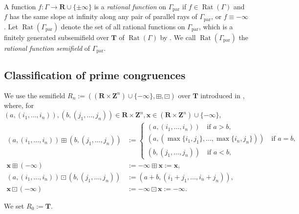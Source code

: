 \documentclass[a4paper,12pt]{amsart}
\theoremstyle{plain}
\theoremstyle{definition}
\begin{document}
A function $f : \varGamma \to \boldsymbol{R} \cup \{ \pm \infty \}$ is a \textit{rational function} on $\varGamma_{\operatorname{par}}$ if $f \in \operatorname{Rat}(\varGamma)$ and $f$ has the same slope at infinity along any pair of parallel rays of $\varGamma_{\operatorname{par}}$, or $f \equiv - \infty$.
Let $\operatorname{Rat}(\varGamma_{\operatorname{par}})$ denote the set of all rational functions on $\varGamma_{\operatorname{par}}$, which is a finitely generated subsemifield over $\boldsymbol{T}$ of $\operatorname{Rat}(\varGamma)$ by \cite[Proposition~4.4]{JuAe7}.
We call $\operatorname{Rat}(\varGamma_{\operatorname{par}})$ the \textit{rational function semifield} of $\varGamma_{\operatorname{par}}$.

\subsection{Classification of prime congruences}
    \label{subsection5.2}

We use the semifield $R_n := ((\boldsymbol{R} \times \boldsymbol{Z}^n) \cup \{ -\infty \}, \boxplus, \boxdot)$ over $\boldsymbol{T}$ introduced in \cite[Subsection~4.6]{JuAe7}, where, for $(a, (i_1, \ldots, i_n)), (b, (j_1, \ldots, j_n)) \in \boldsymbol{R} \times \boldsymbol{Z}^n, \boldsymbol{x} \in (\boldsymbol{R} \times \boldsymbol{Z}^n) \cup \{ -\infty \}$,
\begin{align*}
(a, (i_1, \ldots, i_n)) \boxplus (b, (j_1, \ldots, j_n)) &:= \begin{cases}
(a, (i_1, \ldots, i_n)) \quad \text{if }a > b,\\
(a, (\operatorname{max}\{ i_1, j_1 \}, \ldots, \operatorname{max}\{ i_n, j_n \})) \quad \text{if }a = b,\\
(b, (j_1, \ldots, j_n)) \quad \text{if }a < b,
\end{cases}\\
\boldsymbol{x} \boxplus (-\infty) &:= -\infty \boxplus \boldsymbol{x} := \boldsymbol{x},\\
(a, (i_1, \ldots, i_n)) \boxdot (b, (j_1, \ldots, j_n)) &:= (a + b, (i_1 + j_1, \ldots, i_n + j_n)),\\
\boldsymbol{x} \boxdot (-\infty) &:= -\infty \boxdot \boldsymbol{x} := -\infty.
\end{align*}

We set $R_0 := \boldsymbol{T}$.
\end{document}
